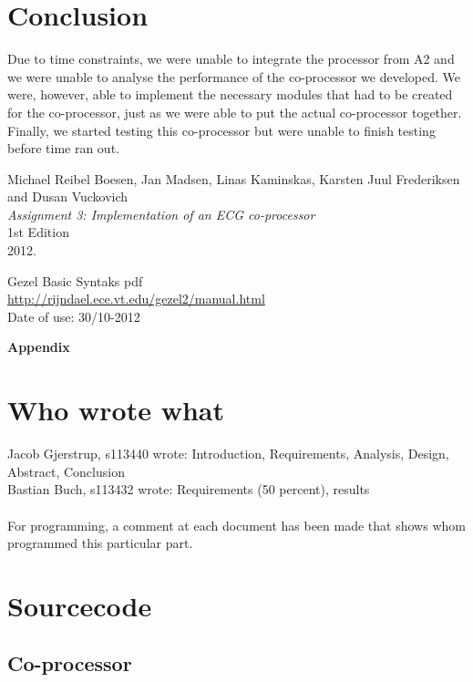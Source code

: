 \documentclass[12pt,a4paper]{article}
\begin{document}
\section{Conclusion}
	Due to time constraints, we were unable to integrate the processor from A2 and we were unable to analyse the performance of the co-processor we developed. We were, however, able to implement the necessary modules that had to be created for the co-processor, just as we were able to put the actual co-processor together. Finally, we started testing this co-processor but were unable to finish testing before time ran out.
\newpage
\begin{thebibliography}{9}

  Michael Reibel Boesen, Jan Madsen, Linas Kaminskas, Karsten Juul Frederiksen and Dusan Vuckovich\\
  \emph{Assignment 3: Implementation of an ECG co-processor}\\
  1st Edition\\
  2012.

	Gezel Basic Syntaks pdf\\

	\url{http://rijndael.ece.vt.edu/gezel2/manual.html} \\
	Date of use: 30/10-2012
	
\end{thebibliography}
	
\newpage	
	\begin{Large}
		\textbf{Appendix}
	\end{Large}
	\appendix

\section{Who wrote what}
Jacob Gjerstrup, s113440 wrote: Introduction, Requirements, Analysis, Design, Abstract, Conclusion\\
Bastian Buch, s113432 wrote: Requirements (50 percent), results\\
\\
For programming, a comment at each document has been made that shows whom programmed this particular part.
	
\section{Sourcecode}
\subsection{Co-processor}
	
\end{document}
